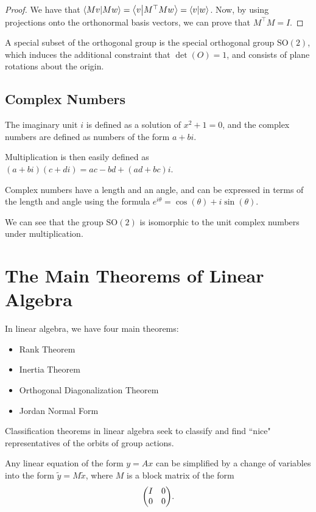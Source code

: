 \begin{proof}
    We have that $\braket{Mv}{Mw} = \braket{v}{M^\top M w} = \braket{v}{w}$. Now, by using projections onto the orthonormal basis vectors, we can prove that $M^\top M = I$.
\end{proof}

A special subset of the orthogonal group is the special orthogonal group $\mathrm{SO}(2)$, which induces the additional constraint that $\det(O) = 1$, and consists of plane rotations about the origin.

\subsection{Complex Numbers}

The imaginary unit $i$ is defined as a solution of $x^2 + 1 = 0$, and the complex numbers are defined as numbers of the form $a + bi$.

Multiplication is then easily defined as $(a + bi)(c + di) = ac - bd + (ad + bc)i$.

Complex numbers have a length and an angle, and can be expressed in terms of the length and angle using the formula $e^{i\theta} = \cos(\theta) + i\sin(\theta)$. 

We can see that the group $\mathrm{SO}(2)$ is isomorphic to the unit complex numbers under multiplication.

\section{The Main Theorems of Linear Algebra}

In linear algebra, we have four main theorems:

\begin{itemize}
    \item Rank Theorem
    \item Inertia Theorem
    \item Orthogonal Diagonalization Theorem
    \item Jordan Normal Form
\end{itemize}

\begin{definition}
    Classification theorems in linear algebra seek to classify and find ``nice" representatives of the orbits of group actions.
\end{definition}

\begin{theorem}
    Any linear equation of the form $y = Ax$ can be simplified by a change of variables into the form $\tilde y = M\tilde x$, where $M$ is a  block matrix of the form \[\mqty(I & 0 \\ 0 & 0).\]
\end{theorem}

